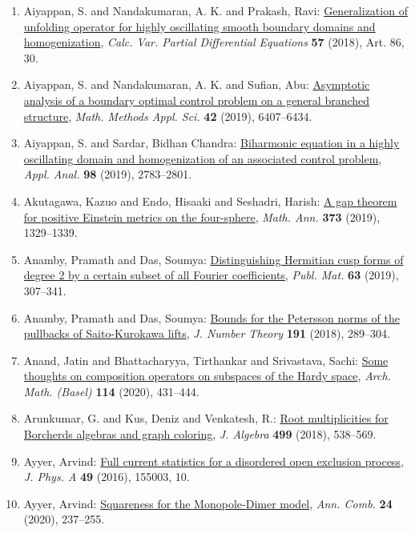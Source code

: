 \begin{enumerate}
\item Aiyappan, S. and Nandakumaran, A. K. and Prakash, Ravi: \href{https://doi.org/10.1007/s00526-018-1354-6}{Generalization of unfolding operator for highly oscillating
smooth boundary domains and homogenization}, \emph{Calc. Var. Partial Differential Equations} {\bf 57} (2018), Art. 86, 30.
\item Aiyappan, S. and Nandakumaran, A. K. and Sufian, Abu: \href{https://doi.org/10.1002/mma.5748}{Asymptotic analysis of a boundary optimal control problem on a
general branched structure}, \emph{Math. Methods Appl. Sci.} {\bf 42} (2019), 6407--6434.
\item Aiyappan, S. and Sardar, Bidhan Chandra: \href{https://doi.org/10.1080/00036811.2018.1471207}{Biharmonic equation in a highly oscillating domain and
homogenization of an associated control problem}, \emph{Appl. Anal.} {\bf 98} (2019), 2783--2801.
\item Akutagawa, Kazuo and Endo, Hisaaki and Seshadri, Harish: \href{https://doi.org/10.1007/s00208-018-1749-x}{A gap theorem for positive {E}instein metrics on the
four-sphere}, \emph{Math. Ann.} {\bf 373} (2019), 1329--1339.
\item Anamby, Pramath and Das, Soumya: \href{https://doi.org/10.5565/PUBLMAT6311911}{Distinguishing {H}ermitian cusp forms of degree 2 by a certain
subset of all {F}ourier coefficients}, \emph{Publ. Mat.} {\bf 63} (2019), 307--341.
\item Anamby, Pramath and Das, Soumya: \href{https://doi.org/10.1016/j.jnt.2018.03.011}{Bounds for the {P}etersson norms of the pullbacks of
{S}aito-{K}urokawa lifts}, \emph{J. Number Theory} {\bf 191} (2018), 289--304.
\item Anand, Jatin and Bhattacharyya, Tirthankar and Srivastava,
Sachi: \href{https://doi.org/10.1007/s00013-019-01406-6}{Some thoughts on composition operators on subspaces of the
{H}ardy space}, \emph{Arch. Math. (Basel)} {\bf 114} (2020), 431--444.
\item Arunkumar, G. and Kus, Deniz and Venkatesh, R.: \href{https://doi.org/10.1016/j.jalgebra.2017.11.050}{Root multiplicities for {B}orcherds algebras and graph
coloring}, \emph{J. Algebra} {\bf 499} (2018), 538--569.
\item Ayyer, Arvind: \href{https://doi.org/10.1088/1751-8113/49/15/155003}{Full current statistics for a disordered open exclusion
process}, \emph{J. Phys. A} {\bf 49} (2016), 155003, 10.
\item Ayyer, Arvind: \href{https://doi.org/10.1007/s00026-019-00480-5}{Squareness for the {M}onopole-{D}imer model}, \emph{Ann. Comb.} {\bf 24} (2020), 237--255.

\end{enumerate}
